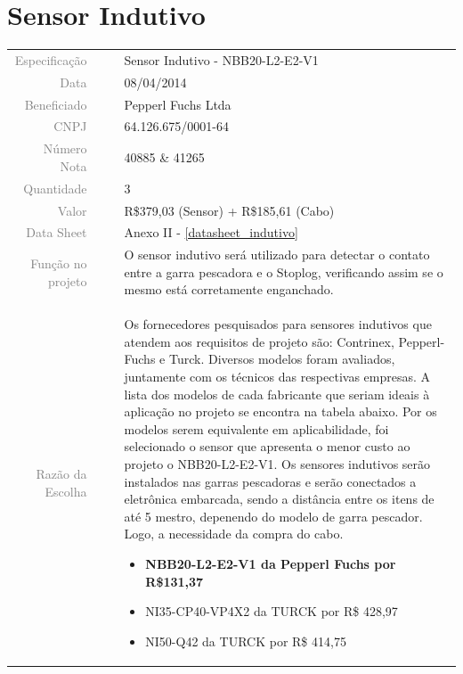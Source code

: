 

\section{Sensor Indutivo}
\label{indutivo}


\begin{table}[ht!]

	\begin{tabular}{r l|l p{12cm} }
		
		\textcolor{gray}{Especificação} &&& 	{Sensor Indutivo - NBB20-L2-E2-V1 }\\
		\textcolor{gray}{Data} &&& 				{08/04/2014}\\
        \textcolor{gray}{Beneficiado} &&&		{Pepperl Fuchs Ltda} \\
        \textcolor{gray}{CNPJ} &&& 				{64.126.675/0001-64} \\
        \textcolor{gray}{Número Nota} &&& 		{40885 \& 41265} \\
		\textcolor{gray}{Quantidade} &&& 		{3} \\
		\textcolor{gray}{Valor} &&& 			{R\$379,03 (Sensor) + R\$185,61 (Cabo)} \\
		\textcolor{gray}{Data Sheet} &&& 		{Anexo II - \ref{datasheet_indutivo} } \\

		\textcolor{gray}{Função no projeto} &&& {O sensor indutivo será utilizado para detectar o contato entre a garra pescadora e o Stoplog, verificando assim se o mesmo está corretamente enganchado. } \\
		\textcolor{gray}{Razão da Escolha} &&& {Os fornecedores pesquisados para sensores indutivos que atendem aos requisitos de projeto são: Contrinex, Pepperl-Fuchs e Turck. Diversos modelos foram avaliados, juntamente com os técnicos das respectivas empresas. A lista dos modelos de cada fabricante que seriam ideais à aplicação no projeto se encontra na tabela abaixo. Por os modelos serem equivalente em aplicabilidade, foi selecionado o sensor que apresenta o menor custo ao projeto o NBB20-L2-E2-V1. Os sensores indutivos serão instalados nas garras pescadoras e serão conectados a eletrônica embarcada, sendo a distância entre os itens de até 5 mestro, depenendo do modelo de garra pescador. Logo, a necessidade da compra do cabo. 
		\begin{itemize}
		  \item \textbf {NBB20-L2-E2-V1 da Pepperl Fuchs  por R\$131,37}
		  \item NI35-CP40-VP4X2 da TURCK por R\$ 428,97 
		  \item NI50-Q42 da TURCK por R\$ 414,75
		\end{itemize}}
		

	\end{tabular}
\end{table}

